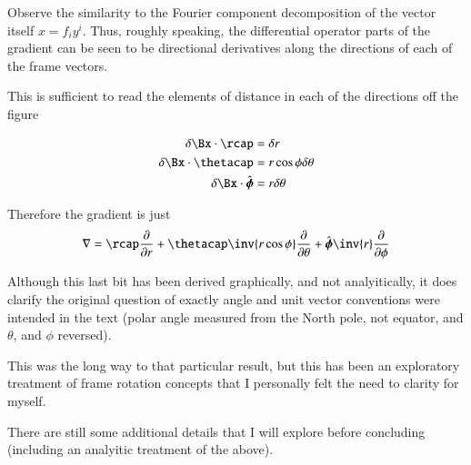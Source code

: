 \documentclass{article}
\newcommand{\phicap}[0]{\hat{\boldsymbol{\phi}}}
\begin{document}
Observe the similarity to the Fourier component decomposition of the vector itself $x = f_i y^i$.  Thus, roughly speaking, the differential operator
parts of the gradient can be seen to be directional derivatives 
along the directions of each of the frame vectors.

This is sufficient to read the elements of distance in each of the directions
off the figure

\begin{align*}
\delta \Bx \cdot \rcap &= \delta r \\
\delta \Bx \cdot \thetacap &= r \cos\phi \delta \theta \\
\delta \Bx \cdot \phicap &= r \delta \theta \\
\end{align*}

Therefore the gradient is just
\begin{align}
\grad = 
\rcap \PD{r}{}
+\thetacap \inv{r \cos\phi} \PD{\theta}{} 
+\phicap \inv{r} \PD{\phi}{}
\end{align}

Although this last bit has been
derived graphically, and not analyitically, it does
clarify the original question of exactly angle and unit vector 
conventions were intended in the text (polar angle measured from the North pole, not equator, and $\theta$, and $\phi$ reversed).

This was the long way to that particular result, but this has been
an exploratory treatment of frame rotation concepts that I personally 
felt the need to clarity for myself.

There are still some additional details that I will explore before concluding
(including an analyitic treatment of the above).
\end{document}

